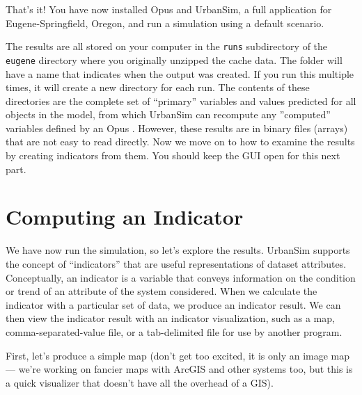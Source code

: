 \documentclass{howto}
\begin{document}
That's it!  You have now installed Opus and UrbanSim, a full
application for Eugene-Springfield, Oregon, and run a simulation
using a default scenario.

The results are all stored on your computer in the \verb|runs| subdirectory
of the \verb|eugene| directory where you originally unzipped the cache
data.  The folder will have a name that indicates when the output was
created. If you run this multiple times, it will create a new directory for
each run.  The contents of these directories are the complete set of
``primary'' variables and values predicted for all objects in the model,
from which UrbanSim can recompute any ''computed'' variables defined by an
Opus .  However, these results are in binary files (arrays) that are not
easy to read directly.  Now we move on to how to examine the results by
creating indicators from them.  You should keep the GUI open for this next
part.

\section*{Computing an Indicator}

We have now run the simulation, so let's explore the results.
UrbanSim supports the concept of ``indicators'' that are useful
representations of dataset attributes.  Conceptually, an indicator 
 is a variable that conveys information on the condition or trend of
an attribute of the system considered. When we calculate the indicator with a particular set of data,
 we produce an indicator result. We can then view the indicator result with an indicator visualization, such as
a map, comma-separated-value file, or a tab-delimited file for use by
another program.

First, let's produce a simple map (don't get too excited, it is only
an image map --- we're working on fancier maps with ArcGIS and other
systems too, but this is a quick visualizer that doesn't have all
the overhead of a GIS).
\end{document}
